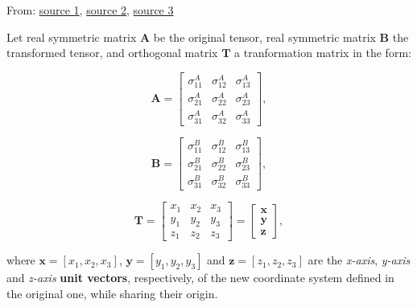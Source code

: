 From:
\href{https://wp.optics.arizona.edu/optomech/wp-content/uploads/sites/53/2016/10/OPTI_222_W21.pdf}{source 1},
\href{https://www.continuummechanics.org/principalstressesandstrains.html}{source 2},
\href{https://www.ecourses.ou.edu/cgi-bin/eBook.cgi?doc=&topic=me&chap_sec=07.2&page=theory}{source 3}

Let real symmetric matrix  $\mathbf{A}$ be the original tensor,
real symmetric matrix $\mathbf{B}$ the transformed tensor, and
orthogonal matrix $\mathbf{T}$ a tranformation matrix in the form:

\begin{equation}
    \mathbf{A} = \begin{bmatrix}
        \sigma^{A}_{11} & \sigma^{A}_{12} & \sigma^{A}_{13} \\
        \sigma^{A}_{21} & \sigma^{A}_{22} & \sigma^{A}_{23} \\
        \sigma^{A}_{31} & \sigma^{A}_{32} & \sigma^{A}_{33}
    \end{bmatrix}
,\end{equation}

\begin{equation}
    \mathbf{B} = \begin{bmatrix}
        \sigma^{B}_{11} & \sigma^{B}_{12} & \sigma^{B}_{13} \\
        \sigma^{B}_{21} & \sigma^{B}_{22} & \sigma^{B}_{23} \\
        \sigma^{B}_{31} & \sigma^{B}_{32} & \sigma^{B}_{33}
    \end{bmatrix}
,\end{equation}

\begin{equation}
    \mathbf{T} = \begin{bmatrix}
        x_1 & x_2 & x_3 \\
        y_1 & y_2 & y_3 \\
        z_1 & z_2 & z_3
    \end{bmatrix} = \begin{bmatrix}
        \mathbf{x} \\
        \mathbf{y} \\
        \mathbf{z}
    \end{bmatrix}
,\end{equation}

where $\mathbf{x} = [x_1, x_2, x_3]$, $\mathbf{y} = [y_1, y_2, y_3]$ and
$\mathbf{z} = [z_1, z_2, z_3]$ are the \textit{x-axis}, \textit{y-axis} and
\textit{z-axis} \textbf{unit vectors}, respectively, of the new coordinate
system defined in the original one, while sharing their origin.

